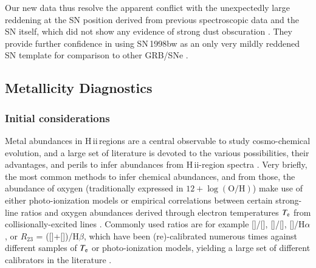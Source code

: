 \documentclass[traditabstract]{aa}
\newcommand{\hb}{H$\beta$}
\newcommand{\ha}{H$\alpha$}
\newcommand{\hii}{\mbox{H\,{\sc ii}}}
\newcommand{\oh}{$12+\log(\mathrm{O/H})$}
\newcommand{\oii}{[\ion{O}{ii}]}
\newcommand{\oiii}{[\ion{O}{iii}]}
\newcommand{\nii}{[\ion{N}{ii}]}
\begin{document}
Our new data thus resolve the apparent conflict with the unexpectedly large reddening at the SN position derived from previous spectroscopic data \citep{2006A&A...454..103H, 2008A&A...490...45C} and the SN itself, which did not show any evidence of strong dust obscuration \citep[e.g.][]{1998Natur.395..672I, 2001ApJ...555..900P}. They provide further confidence in using SN\,1998bw as an only very mildly reddened SN template for comparison to other GRB/SNe \citep[e.g.][and numerous references therein]{2004ApJ...609..952Z, 2016arXiv160606791K}.

\subsection{Metallicity Diagnostics}

\subsubsection{Initial considerations}


Metal abundances in \hii\,regions are a central observable to study cosmo-chemical evolution, and a large set of literature is devoted to the various possibilities, their advantages, and perils to infer abundances from \hii-region spectra  \citep[e.g.][]{1979MNRAS.189...95P, 1991ApJ...380..140M, 2005ApJ...631..231P, 2008ApJ...681.1183K}. Very briefly, the most common methods to infer chemical abundances, and from those, the abundance of oxygen (traditionally expressed in \oh) make use of either photo-ionization models \citep[e.g.][]{1985ApJS...58..125E, 2000ApJ...542..224D, 2002ApJS..142...35K} or empirical correlations between certain strong-line ratios and oxygen abundances derived through electron temperatures $T_{\rm{e}}$ from collisionally-excited lines \citep[CELs, e.g.][]{2004MNRAS.348L..59P, 2013A&A...559A.114M}. Commonly used ratios are for example \nii/\oii, \oiii/\nii, \nii/\ha, or $R_{23}$ = (\oii+\oiii)/\hb, which have been (re)-calibrated numerous times against different samples of $T_{\rm{e}}$ or photo-ionization models, yielding a large set of different calibrators in the literature \citep[e.g.][]{2002ApJS..142...35K, 2004ApJ...617..240K, 2005ApJ...631..231P, 2006A&A...459...85N, 2008A&A...488..463M}.
\end{document}
